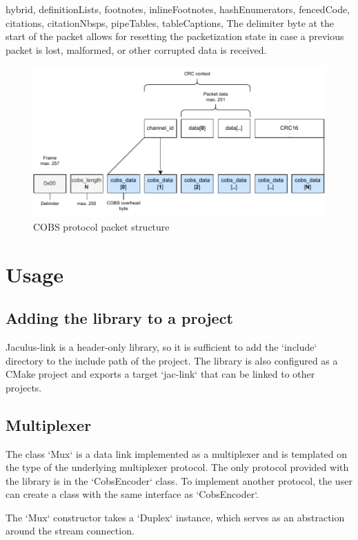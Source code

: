 \begin{markdown*}{%
  hybrid,
  definitionLists,
  footnotes,
  inlineFootnotes,
  hashEnumerators,
  fencedCode,
  citations,
  citationNbsps,
  pipeTables,
  tableCaptions,
}
The delimiter byte at the start of the packet allows for resetting the packetization state in case a previous packet is lost, malformed, or other corrupted data is received.

\begin{figure}[!ht]
    \centering
    \includegraphics[width=\textwidth]{img/cobs-diagram}
    \caption{COBS protocol packet structure}
    \label{fig:cobs-diagram}
\end{figure}


\section{Usage}

\subsection{Adding the library to a project}

Jaculus-link is a header-only library, so it is sufficient to add the `include` directory to the include path of the project. The library is also configured as a CMake project and exports a target `jac-link` that can be linked to other projects.

\subsection{Multiplexer}

The class `Mux` is a data link implemented as a multiplexer and is templated on the type of the underlying multiplexer protocol. The only protocol provided with the library is in the `CobsEncoder` class. To implement another protocol, the user can create a class with the same interface as `CobsEncoder`.

The `Mux` constructor takes a `Duplex` instance, which serves as an abstraction around the stream connection.


\end{markdown*}
